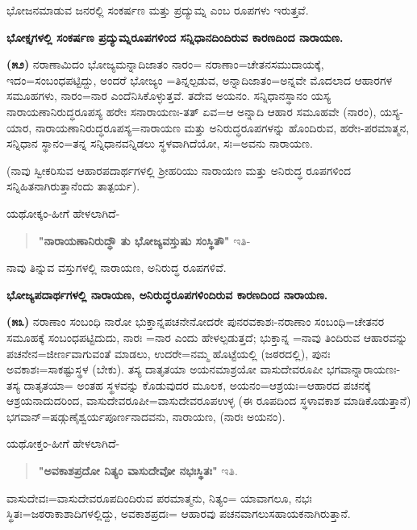 \noindent
ಭೋಜನಮಾಡುವ ಜನರಲ್ಲಿ ಸಂಕರ್ಷಣ ಮತ್ತು ಪ್ರದ್ಯುಮ್ನ ಎಂಬ ರೂಪಗಳು ಇರುತ್ತವೆ.

\begin{center}
\textbf{ಭೋಕ್ತೃಗಳಲ್ಲಿ ಸಂಕರ್ಷಣ ಪ್ರದ್ಯುಮ್ನರೂಪಗಳಿಂದ ಸನ್ನಿಧಾನದಿಂದಿರುವ ಕಾರಣದಿಂದ ನಾರಾಯಣ.}
\end{center}

\textbf{(೫೨)} ನರಾಣಾಮಿದಂ ಭೋಜ್ಯಮನ್ನಾದಿಜಾತಂ ನಾರಂ= ನರಾಣಾಂ=ಚೇತನಸಮು\-ದಾಯಕ್ಕೆ, ಇದಂ=ಸಂಬಂಧಪಟ್ಟಿದ್ದು, ಅಂದರೆ ಭೋಜ್ಯಂ =ತಿನ್ನಲ್ಪಡುವ, ಅನ್ನಾದಿ\-ಜಾತಂ=\break ಅನ್ನವೇ ಮೊದಲಾದ ಆಹಾರಗಳ ಸಮೂಹಗಳು, ನಾರಂ=ನಾರ ಎಂದೆನಿಸಿಕೊಳ್ಳುತ್ತವೆ. ತದೇವ ಅಯನಂ. ಸನ್ನಿಧಾನಸ್ಥಾನಂ ಯಸ್ಯ ನಾರಾಯಣಾನಿರುದ್ಧರೂಪಸ್ಯ ಹರೇಃ ಸ\break ನಾರಾಯಣಃ-ತತ್ ಏವ=ಆ ಅನ್ನಾದಿ ಆಹಾರ ಸಮೂಹವೇ (ನಾರಂ), ಯಸ್ಯ-ಯಾರ, ನಾರಾಯಣಾನಿರುದ್ಧರೂಪಸ್ಯ=ನಾರಾಯಣ ಮತ್ತು ಅನಿರುದ್ಧರೂಪಗಳನ್ನು ಹೊಂದಿರುವ, ಹರೇಃ-ಪರಮಾತ್ಮನ, ಸನ್ನಿಧಾನ ಸ್ಥಾನಂ=ತನ್ನ ಸನ್ನಿಧಾನವನ್ನಿಡಲು ಸ್ಥಳವಾಗಿದೆಯೋ, ಸಃ=\break ಅವನು ನಾರಾಯಣ.

(ನಾವು ಸ್ವೀಕರಿಸುವ ಆಹಾರಪದಾರ್ಥಗಳಲ್ಲಿ ಶ‍್ರೀಹರಿಯು ನಾರಾಯಣ ಮತ್ತು ಅನಿರುದ್ಧ ರೂಪಗಳಿಂದ ಸನ್ನಿಹಿತನಾಗಿರುತ್ತಾನೆಂದು ತಾತ್ಪರ್ಯ).

ಯಥೋಕ್ಕಂ-ಹೀಗೆ ಹೇಳಲಾಗಿದೆ-

\begin{verse}
\textbf{"ನಾರಾಯಣಾನಿರುದ್ಧೌ ತು ಭೋಜ್ಯವಸ್ತುಷು ಸಂಸ್ಥಿತೌ"} ಇತಿ-
\end{verse}

\noindent
ನಾವು ತಿನ್ನುವ ವಸ್ತುಗಳಲ್ಲಿ ನಾರಾಯಣ, ಅನಿರುದ್ಧ ರೂಪಗಳಿವೆ.

\begin{center}
\textbf{ಭೋಜ್ಯಪದಾರ್ಥಗಳಲ್ಲಿ ನಾರಾಯಣ, ಅನಿರುದ್ಧರೂಪಗಳಿಂದಿರುವ ಕಾರಣದಿಂದ ನಾರಾಯಣ.}
\end{center}

\textbf{(೫೩)} ನರಾಣಾಂ ಸಂಬಂಧಿ ನಾರೋ ಭುಕ್ತಾನ್ನಪಚನೇನೋದರೇ ಪುನರವಕಾಶಃ-\-ನರಾಣಾಂ ಸಂಬಂಧಿ=ಚೇತನರ ಸಮೂಹಕ್ಕೆ ಸಂಬಂಧಪಟ್ಟಿದುದು, ನಾರಃ =ನಾರ ಎಂದು ಹೇಳಲ್ಪಡುತ್ತದೆ; ಭುಕ್ತಾನ್ನ =ನಾವು ತಿಂದಿರುವ ಆಹಾರವನ್ನು ಪಚನೇನ=ಜೀರ್ಣವಾಗುವಂತೆ ಮಾಡಲು, ಉದರೇ=ನಮ್ಮ ಹೊಟ್ಟೆಯಲ್ಲಿ (ಜಠರದಲ್ಲಿ), ಪುನಃ ಅವಕಾಶಃ=ಸಾಕಷ್ಟುಸ್ಥಳ (ಬೇಕು). ತಸ್ಯ ದಾತೃತಯಾ ಅಯನಮಾಶ್ರಯೋ ವಾಸುದೇವರೂಪೀ ಭಗವಾನ್ನಾರಾಯಣಃ-ತಸ್ಯ ದಾತೃತಯಾ= ಅಂತಹ ಸ್ಥಳವನ್ನು ಕೊಡುವುದರ ಮೂಲಕ, ಅಯನಂ=ಆಶ್ರಯಃ=\break ಆಹಾರದ ಪಚನಕ್ಕೆ ಆಶ್ರಯನಾದುದರಿಂದ, ವಾಸುದೇವರೂಪೀ=ವಾಸುದೇವರೂಪಉಳ್ಳ (ಈ ರೂಪದಿಂದ ಸ್ಥಳಾವಕಾಶ ಮಾಡಿಕೊಡುತ್ತಾನೆ) ಭಗವಾನ್=ಷಡ್ಗುಣೈಶ್ವರ್ಯಪೂರ್ಣನಾದ\-ವನು, ನಾರಾಯಣ, (ನಾರಃ ಅಯನಂ).

ಯಥೋಕ್ತಂ-ಹೀಗೆ ಹೇಳಲಾಗಿದೆ-

\begin{verse}
\textbf{"ಅವಕಾಶಪ್ರದೋ ನಿತ್ಯಂ ವಾಸುದೇವೋ ನಭಃಸ್ಥಿತಃ"} ಇತಿ.
\end{verse}

ವಾಸುದೇವಃ=ವಾಸುದೇವರೂಪದಿಂದಿರುವ ಪರಮಾತ್ಮನು, ನಿತ್ಯಂ= ಯಾವಾಗಲೂ, ನಭಃ ಸ್ಥಿತಃ=ಜಠರಾಕಾಶಾದಿಗಳಲ್ಲಿದ್ದು, ಅವಕಾಶಪ್ರದಃ= ಆಹಾರವು ಪಚನವಾಗಲು\break ಸಹಾಯಕನಾಗಿರುತ್ತಾನೆ.

